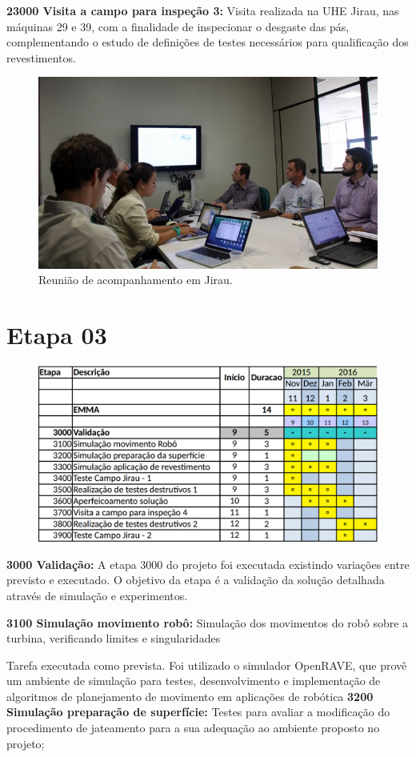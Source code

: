 \noindent
\textbf{23000 Visita a campo para inspeção 3:} Visita realizada na UHE Jirau,
nas máquinas 29 e 39, com a finalidade de inspecionar o desgaste das pás,
complementando o estudo de definições de testes necessários para qualificação
dos revestimentos.

\begin{figure}[h!]
\centering
\includegraphics[width=0.6\columnwidth]{figs/img_4836}
\caption{Reunião de acompanhamento em Jirau.}
\label{fig::reuniao}
\end{figure} 

\section{Etapa 03} 

\begin{figure}[H]
\centering
\includegraphics[width=0.9\columnwidth]{figs/etapa03_final_gisele}
\end{figure} 

\noindent
\textbf{3000 Validação:} A etapa 3000 do projeto foi executada existindo
variações entre previsto e executado. O objetivo da etapa é a validação da
solução detalhada através de simulação e experimentos.

\noindent
\textbf{3100 Simulação movimento robô:} 
Simulação dos movimentos do robô sobre a turbina, verificando limites e singularidades

Tarefa executada como prevista. Foi utilizado o simulador OpenRAVE, que provê
um ambiente de simulação para testes, desenvolvimento e implementação de
algoritmos de planejamento de movimento em aplicações de robótica
\noindent
\textbf{3200 Simulação preparação de superfície:}
Testes para avaliar a modificação do procedimento de jateamento para a sua adequação ao ambiente proposto no projeto;

